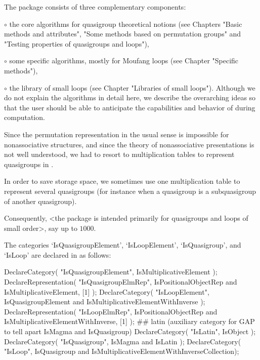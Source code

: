 
The package consists of three complementary components:
\beginlist%
\item{$\circ$} the core algorithms for quasigroup theoretical notions
    (see Chapters "Basic methods and attributes",
    "Some methods based on permutation groups" and
    "Testing properties of quasigroups and loops"),
\item{$\circ$} some specific algorithms, mostly for Moufang loops
    (see Chapter "Specific methods"),
\item{$\circ$} the library of small loops (see Chapter
    "Libraries of small loops").
\endlist
Although we do not explain the algorithms in detail here, we describe the
overarching ideas so that the user should be able to anticipate the
capabilities and behavior of {\LOOPS} during computation.


Since the permutation representation in the usual sense is impossible for
nonassociative structures, and since the theory of nonassociative presentations
is not well understood, we had to resort to multiplication tables to represent
quasigroups in {\GAP}.

In order to save storage space, we sometimes use one multiplication table to
represent several quasigroups (for instance when a quasigroup is a
subquasigroup of another quasigroup).

Consequently, <the package is intended primarily for quasigroups and loops of
small order>, say up to $1000$.

The categories `IsQuasigroupElement', `IsLoopElement', `IsQuasigroup', and
`IsLoop' are declared in {\LOOPS} as follows:

\begintt
DeclareCategory( "IsQuasigroupElement", IsMultiplicativeElement );
DeclareRepresentation( "IsQuasigroupElmRep",
    IsPositionalObjectRep and IsMultiplicativeElement, [1] );
DeclareCategory( "IsLoopElement",
    IsQuasigroupElement and IsMultiplicativeElementWithInverse );
DeclareRepresentation( "IsLoopElmRep",
    IsPositionalObjectRep and IsMultiplicativeElementWithInverse, [1] );
## latin (auxiliary category for GAP to tell apart IsMagma and IsQuasigroup)
DeclareCategory( "IsLatin", IsObject );
DeclareCategory( "IsQuasigroup", IsMagma and IsLatin );
DeclareCategory( "IsLoop", IsQuasigroup and
    IsMultiplicativeElementWithInverseCollection);
\endtt

